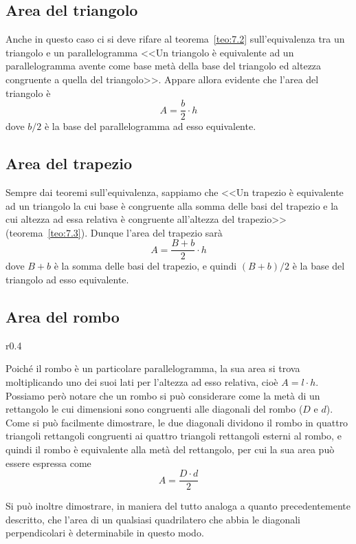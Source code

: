 \subsection{Area del triangolo}

Anche in questo caso ci si deve rifare al teorema~\ref{teo:7.2} 
sull'equivalenza tra un triangolo e un parallelogramma <<Un triangolo 
è equivalente ad un parallelogramma avente come base metà della base 
del triangolo ed altezza congruente a quella del triangolo>>. Appare 
allora evidente che l'area del triangolo è
\[\boxed{A=\dfrac{b}{2}\cdot h}\]
dove \(b/2\) è la base del parallelogramma ad esso equivalente.

\subsection{Area del trapezio}

Sempre dai teoremi sull'equivalenza, sappiamo che <<Un trapezio è 
equivalente ad un triangolo la cui base è congruente alla somma delle 
basi del trapezio e la cui altezza ad essa relativa è congruente 
all'altezza del trapezio>> (teorema~\ref{teo:7.3}). Dunque l'area del 
trapezio sarà
\[\boxed{A=\dfrac{B+b}{2}\cdot h}\]
dove \(B + b\) è la somma delle basi del trapezio, e quindi \((B + b)/2\) 
è la base del triangolo ad esso equivalente.

\subsection{Area del rombo}

\begin{wrapfigure}{r}{0.4\textwidth}
  \centering
\end{wrapfigure}
Poiché il rombo è un particolare parallelogramma, la sua area si 
trova moltiplicando uno dei suoi lati per l'altezza ad esso relativa, 
cioè \(A=l\cdot h\).
Possiamo però notare che un rombo si può considerare come la metà di 
un rettangolo le cui dimensioni sono congruenti alle diagonali del 
rombo (\(D\) e \(d\)).
Come si può facilmente dimostrare, le due diagonali dividono il rombo 
in quattro triangoli rettangoli congruenti ai quattro triangoli 
rettangoli esterni al rombo, e quindi il rombo è equivalente alla 
metà del rettangolo, per cui la sua area può essere espressa come
\[\boxed{A=\dfrac{D\cdot d}{2}}\]

Si può inoltre dimostrare, in maniera del tutto analoga a quanto 
precedentemente descritto, che l'area di un qualsiasi quadrilatero 
che abbia le diagonali perpendicolari è determinabile in questo modo.


